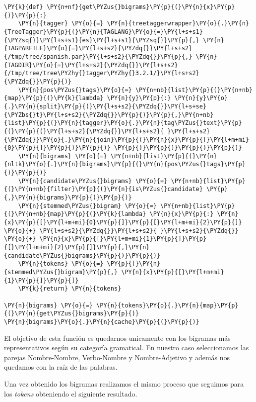 \begin{tcolorbox}[breakable, size=fbox, boxrule=1pt, pad at break*=1mm,colback=cellbackground, colframe=cellborder]
\begin{Verbatim}[commandchars=\\\{\}]
\PY{k}{def} \PY{n+nf}{get\PYZus{}bigrams}\PY{p}{(}\PY{n}{x}\PY{p}{)}\PY{p}{:}
	\PY{n}{tagger} \PY{o}{=} \PY{n}{treetaggerwrapper}\PY{o}{.}\PY{n}{TreeTagger}\PY{p}{(}\PY{n}{TAGLANG}\PY{o}{=}\PY{l+s+s1}{\PYZsq{}}\PY{l+s+s1}{es}\PY{l+s+s1}{\PYZsq{}}\PY{p}{,} \PY{n}{TAGPARFILE}\PY{o}{=}\PY{l+s+s2}{\PYZdq{}}\PY{l+s+s2}{/tmp/tree/spanish.par}\PY{l+s+s2}{\PYZdq{}}\PY{p}{,} \PY{n}{TAGDIR}\PY{o}{=}\PY{l+s+s2}{\PYZdq{}}\PY{l+s+s2}{/tmp/tree/tree\PYZhy{}tagger\PYZhy{}3.2.1/}\PY{l+s+s2}{\PYZdq{}}\PY{p}{)}
	\PY{n}{pos\PYZus{}tags}\PY{o}{=} \PY{n+nb}{list}\PY{p}{(}\PY{n+nb}{map}\PY{p}{(}\PY{k}{lambda} \PY{n}{y}\PY{p}{:} \PY{n}{y}\PY{o}{.}\PY{n}{split}\PY{p}{(}\PY{l+s+s2}{\PYZdq{}}\PY{l+s+se}{\PYZbs{}t}\PY{l+s+s2}{\PYZdq{}}\PY{p}{)}\PY{p}{,}\PY{n+nb}{list}\PY{p}{(}\PY{n}{tagger}\PY{o}{.}\PY{n}{tag\PYZus{}text}\PY{p}{(}\PY{p}{(}\PY{l+s+s2}{\PYZdq{}}\PY{l+s+s2}{ }\PY{l+s+s2}{\PYZdq{}}\PY{o}{.}\PY{n}{join}\PY{p}{(}\PY{n}{x}\PY{p}{[}\PY{l+m+mi}{0}\PY{p}{]}\PY{p}{)}\PY{p}{)} \PY{p}{)}\PY{p}{)}\PY{p}{)}\PY{p}{)}
	\PY{n}{bigrams} \PY{o}{=} \PY{n+nb}{list}\PY{p}{(}\PY{n}{nltk}\PY{o}{.}\PY{n}{bigrams}\PY{p}{(}\PY{n}{pos\PYZus{}tags}\PY{p}{)}\PY{p}{)}
	\PY{n}{candidate\PYZus{}bigrams} \PY{o}{=} \PY{n+nb}{list}\PY{p}{(}\PY{n+nb}{filter}\PY{p}{(}\PY{n}{is\PYZus{}candidate} \PY{p}{,}\PY{n}{bigrams}\PY{p}{)}\PY{p}{)}
	\PY{n}{stemmed\PYZus{}bigram} \PY{o}{=} \PY{n+nb}{list}\PY{p}{(}\PY{n+nb}{map}\PY{p}{(}\PY{k}{lambda} \PY{n}{x}\PY{p}{:} \PY{n}{x}\PY{p}{[}\PY{l+m+mi}{0}\PY{p}{]}\PY{p}{[}\PY{l+m+mi}{2}\PY{p}{]}  \PY{o}{+} \PY{l+s+s2}{\PYZdq{}}\PY{l+s+s2}{ }\PY{l+s+s2}{\PYZdq{}} \PY{o}{+} \PY{n}{x}\PY{p}{[}\PY{l+m+mi}{1}\PY{p}{]}\PY{p}{[}\PY{l+m+mi}{2}\PY{p}{]}\PY{p}{,}\PY{n}{candidate\PYZus{}bigrams}\PY{p}{)}\PY{p}{)}
	\PY{n}{tokens} \PY{o}{=} \PY{p}{[}\PY{n}{stemmed\PYZus{}bigram}\PY{p}{,} \PY{n}{x}\PY{p}{[}\PY{l+m+mi}{1}\PY{p}{]}\PY{p}{]}
	\PY{k}{return} \PY{n}{tokens}

\PY{n}{bigrams} \PY{o}{=} \PY{n}{tokens}\PY{o}{.}\PY{n}{map}\PY{p}{(}\PY{n}{get\PYZus{}bigrams}\PY{p}{)}	
\PY{n}{bigrams}\PY{o}{.}\PY{n}{cache}\PY{p}{(}\PY{p}{)}
\end{Verbatim}
\end{tcolorbox}


El objetivo de esta función es quedarnos unicamente con los bigramas más representativos según su categoría gramatical. En nuestro caso seleccionamos las parejas Nombre-Nombre, Verbo-Nombre y Nombre-Adjetivo y además nos quedamos con la raíz de las palabras.
          
Una vez obtenido los bigramas realizamos el mismo proceso que seguimos para los \textit{tokens} obteniendo el siguiente resultado.

